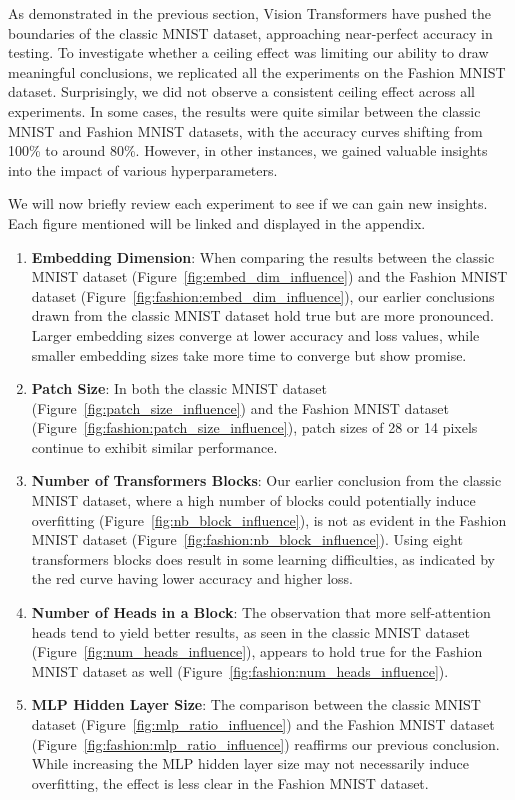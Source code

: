 As demonstrated in the previous section, Vision Transformers have pushed the boundaries of the classic MNIST dataset, approaching near-perfect accuracy in testing. To investigate whether a ceiling effect was limiting our ability to draw meaningful conclusions, we replicated all the experiments on the Fashion MNIST dataset. Surprisingly, we did not observe a consistent ceiling effect across all experiments. In some cases, the results were quite similar between the classic MNIST and Fashion MNIST datasets, with the accuracy curves shifting from 100\% to around 80\%. However, in other instances, we gained valuable insights into the impact of various hyperparameters.

We will now briefly review each experiment to see if we can gain new insights. Each figure mentioned will be linked and displayed in the appendix.
\begin{enumerate}
    \item \textbf{Embedding Dimension}: When comparing the results between the classic MNIST dataset (Figure~\ref{fig:embed_dim_influence}) and the Fashion MNIST dataset (Figure~\ref{fig:fashion:embed_dim_influence}), our earlier conclusions drawn from the classic MNIST dataset hold true but are more pronounced. Larger embedding sizes converge at lower accuracy and loss values, while smaller embedding sizes take more time to converge but show promise.
    
    \item \textbf{Patch Size}: In both the classic MNIST dataset (Figure~\ref{fig:patch_size_influence}) and the Fashion MNIST dataset (Figure~\ref{fig:fashion:patch_size_influence}), patch sizes of 28 or 14 pixels continue to exhibit similar performance.
    
    \item \textbf{Number of Transformers Blocks}: Our earlier conclusion from the classic MNIST dataset, where a high number of blocks could potentially induce overfitting (Figure~\ref{fig:nb_block_influence}), is not as evident in the Fashion MNIST dataset (Figure~\ref{fig:fashion:nb_block_influence}). Using eight transformers blocks does result in some learning difficulties, as indicated by the red curve having lower accuracy and higher loss.
    
    \item \textbf{Number of Heads in a Block}: The observation that more self-attention heads tend to yield better results, as seen in the classic MNIST dataset (Figure~\ref{fig:num_heads_influence}), appears to hold true for the Fashion MNIST dataset as well (Figure~\ref{fig:fashion:num_heads_influence}).
    
    \item \textbf{MLP Hidden Layer Size}: The comparison between the classic MNIST dataset (Figure~\ref{fig:mlp_ratio_influence}) and the Fashion MNIST dataset (Figure~\ref{fig:fashion:mlp_ratio_influence}) reaffirms our previous conclusion. While increasing the MLP hidden layer size may not necessarily induce overfitting, the effect is less clear in the Fashion MNIST dataset.
\end{enumerate}
